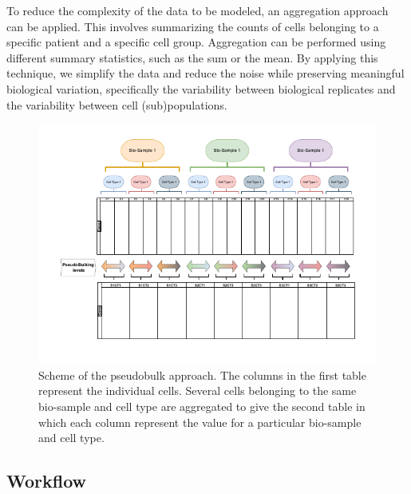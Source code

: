 \documentclass[a4paper, 11pt, twocolumn]{article}
\begin{document}
\begin{multicols}{2}
To reduce the complexity of the data to be modeled, an aggregation approach can be applied. This involves summarizing the counts of cells belonging to a specific patient and a specific cell group. Aggregation can be performed using different summary statistics, such as the sum or the mean. By applying this technique, we simplify the data and reduce the noise while preserving meaningful biological variation, specifically the variability between biological replicates and the variability between cell (sub)populations.
\begin{figure}[H]
	\centering
	\includegraphics[width=1\columnwidth]{img/rnapseudobulk.drawio-1.pdf}
	\caption{{\footnotesize Scheme of the pseudobulk approach. The columns in the first table represent the individual cells. Several cells belonging to the same bio-sample and cell type are aggregated to give the second table in which each column represent the value for a particular bio-sample and cell type.}}
	\label{fig:pseudobulk}
\end{figure}

\subsection{Workflow}


\end{multicols}
\end{document}
